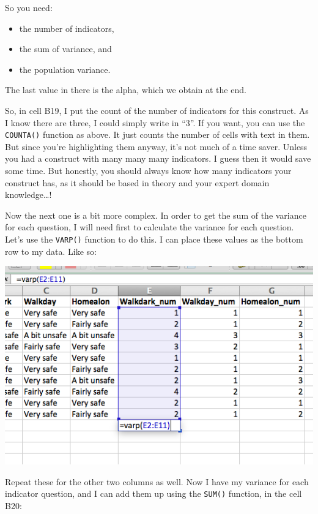 \documentclass[]{book}
\providecommand{\tightlist}{%
  \setlength{\itemsep}{0pt}\setlength{\parskip}{0pt}}
\theoremstyle{definition}
\theoremstyle{definition}
\theoremstyle{definition}
\theoremstyle{remark}
\begin{document}
So you need:

\begin{itemize}
\tightlist
\item
  the number of indicators,
\item
  the sum of variance, and
\item
  the population variance.
\end{itemize}

The last value in there is the alpha, which we obtain at the end.

So, in cell B19, I put the count of the number of indicators for this
construct. As I know there are three, I could simply write in ``3''. If
you want, you can use the \texttt{COUNTA()} function as above. It just
counts the number of cells with text in them. But since you're
highlighting them anyway, it's not much of a time saver. Unless you had
a construct with many many many indicators. I guess then it would save
some time. But honestly, you should always know how many indicators your
construct has, as it should be based in theory and your expert domain
knowledge\ldots{}!

Now the next one is a bit more complex. In order to get the sum of the
variance for each question, I will need first to calculate the variance
for each question. Let's use the \texttt{VARP()} function to do this. I
can place these values as the bottom row to my data. Like so:

\includegraphics{imgs/varp_alpha.png}

Repeat these for the other two columns as well. Now I have my variance
for each indicator question, and I can add them up using the
\texttt{SUM()} function, in the cell B20:
\end{document}
